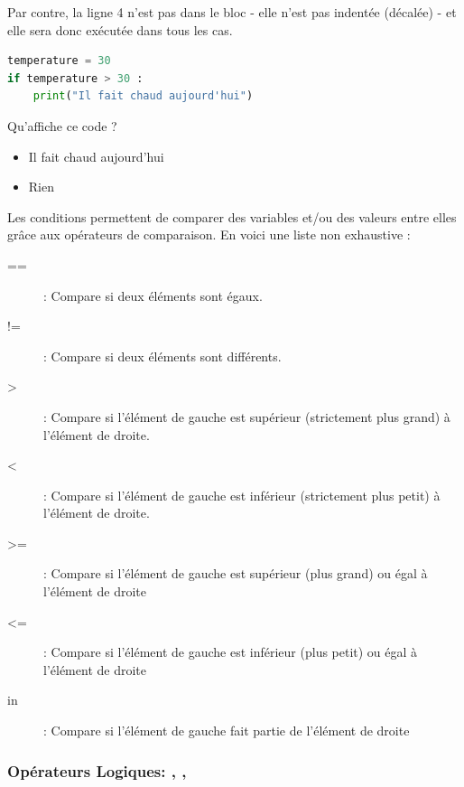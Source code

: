 Par contre, la ligne 4 n'est pas dans le bloc - elle n'est pas indentée (décalée) - et elle sera donc exécutée dans tous les cas.\\[-0.9cm]
\begin{Quizz}
    
    \begin{lstlisting}[style=pythonstyle, language=python]
temperature = 30
if temperature > 30 :
    print("Il fait chaud aujourd'hui")
    \end{lstlisting}
    
    Qu'affiche ce code ?
    \begin{itemize}
        \renewcommand{\labelitemi}{$\square$}
        \item Il fait chaud aujourd'hui
        \item Rien
    \end{itemize}

\end{Quizz}
Les conditions permettent de comparer des variables et/ou des valeurs entre elles grâce aux opérateurs de comparaison. En voici une liste non exhaustive :
    \begin{description}
        \item[==] : Compare si deux éléments sont égaux.
        \item[!=] : Compare si deux éléments sont différents.
        \item[>] : Compare si l'élément de gauche est supérieur (strictement plus grand) à l'élément de droite.
        \item[<] : Compare si l'élément de gauche est inférieur (strictement plus petit) à l'élément de droite.
        \item[>=] : Compare si l'élément de gauche est supérieur (plus grand) ou égal à l'élément de droite
        \item[<=] : Compare si l'élément de gauche est inférieur (plus petit) ou égal à l'élément de droite
        \item[in]: Compare si l'élément de gauche fait partie de l'élément de droite
    \end{description}

\subsubsection*{Opérateurs Logiques: , , }

